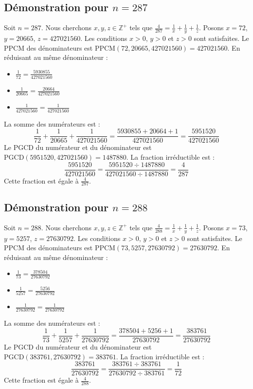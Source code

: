 \documentclass[11pt,a4paper]{article}
\begin{document}
\subsection{Démonstration pour $n = 287$}
Soit $n = 287$. Nous cherchons $x, y, z \in \mathbb{Z}^{+}$ tels que $\frac{4}{287} = \frac{1}{x} + \frac{1}{y} + \frac{1}{z}$.
Posons $x = 72$, $y = 20665$, $z = 427021560$.
Les conditions $x > 0$, $y > 0$ et $z > 0$ sont satisfaites.
Le PPCM des dénominateurs est $\text{PPCM}(72, 20665, 427021560) = 427021560$.
En réduisant au même dénominateur :
\begin{itemize}
    \item $\frac{1}{72} = \frac{5930855}{427021560}$
    \item $\frac{1}{20665} = \frac{20664}{427021560}$
    \item $\frac{1}{427021560} = \frac{1}{427021560}$
\end{itemize}
La somme des numérateurs est :
$$ \frac{1}{72} + \frac{1}{20665} + \frac{1}{427021560} = \frac{5930855 + 20664 + 1}{427021560} = \frac{5951520}{427021560} $$
Le PGCD du numérateur et du dénominateur est $\text{PGCD}(5951520, 427021560) = 1487880$.
La fraction irréductible est :
$$ \frac{5951520}{427021560} = \frac{5951520 \div 1487880}{427021560 \div 1487880} = \frac{4}{287} $$
Cette fraction est égale à $\frac{4}{287}$.

\subsection{Démonstration pour $n = 288$}
Soit $n = 288$. Nous cherchons $x, y, z \in \mathbb{Z}^{+}$ tels que $\frac{4}{288} = \frac{1}{x} + \frac{1}{y} + \frac{1}{z}$.
Posons $x = 73$, $y = 5257$, $z = 27630792$.
Les conditions $x > 0$, $y > 0$ et $z > 0$ sont satisfaites.
Le PPCM des dénominateurs est $\text{PPCM}(73, 5257, 27630792) = 27630792$.
En réduisant au même dénominateur :
\begin{itemize}
    \item $\frac{1}{73} = \frac{378504}{27630792}$
    \item $\frac{1}{5257} = \frac{5256}{27630792}$
    \item $\frac{1}{27630792} = \frac{1}{27630792}$
\end{itemize}
La somme des numérateurs est :
$$ \frac{1}{73} + \frac{1}{5257} + \frac{1}{27630792} = \frac{378504 + 5256 + 1}{27630792} = \frac{383761}{27630792} $$
Le PGCD du numérateur et du dénominateur est $\text{PGCD}(383761, 27630792) = 383761$.
La fraction irréductible est :
$$ \frac{383761}{27630792} = \frac{383761 \div 383761}{27630792 \div 383761} = \frac{1}{72} $$
Cette fraction est égale à $\frac{4}{288}$.
\end{document}
